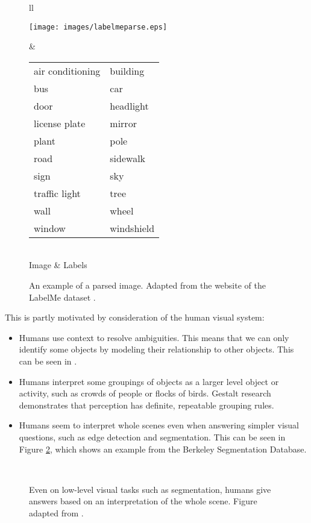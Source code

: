 \documentclass{article}
\newcommand\note[1]{}
\begin{document}
\begin{figure}[ht]
\centering
\begin{tabular}{ll}
\begin{minipage}{2.5in}
\texttt{[image: images/labelmeparse.eps]}
\end{minipage}
&
\begin{minipage}{2.5in}
\begin{tabular}{l l}
air conditioning & building\\
bus & car\\
door & headlight\\
license plate & mirror\\
plant & pole\\
road & sidewalk\\
sign & sky\\
traffic light & tree\\
wall & wheel\\
window & windshield\\
\end{tabular}
\end{minipage}
\\
Image & Labels
\end{tabular}
\caption{An example of a parsed image. Adapted from the website of the
  LabelMe dataset \cite{labelme}.}
\label{fig-labelme}
\end{figure}

This is partly motivated by consideration of the human visual system:
\note{Pedro suggests Palmer for this whole thing, presumably:

  Palmer, S.E. (1999) Vision Science: Photons to Phenomenology, MIT
  Press .}  
\begin{itemize}
\item Humans use context to resolve ambiguities. \cite{visual-context}
  This means that we can only identify some objects by modeling their
  relationship to other objects. This can be seen in \cite{pop}.
\item Humans interpret some groupings of objects as a larger level
  object or activity, such as crowds of people or flocks of birds.
  Gestalt research demonstrates that perception has definite,
  repeatable grouping rules. \cite{gestalt}
\item Humans seem to interpret whole scenes even when answering
  simpler visual questions, such as edge detection and segmentation.
  This can be seen in Figure \ref{fig-bsd}, which shows an example
  from the Berkeley Segmentation Database. \cite{bsd}
\end{itemize}
\begin{figure}
  \centering
{}\\
\caption{Even on low-level visual tasks such as segmentation, humans
  give answers based on an interpretation of the whole scene. Figure
  adapted from \cite{bsd}.}
\label{fig-bsd}
\end{figure}
\end{document}
